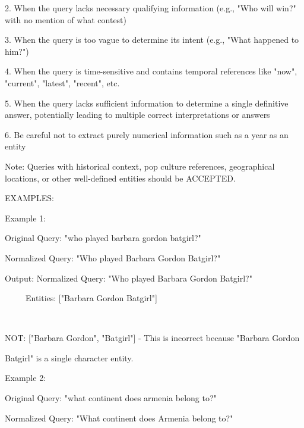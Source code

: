 \begin{tcolorbox}[breakable,title=Prompt Used by the GPT-4o for Data Filtering]
2. When the query lacks necessary qualifying information (e.g., "Who will win?" with no mention of what contest)



3. When the query is too vague to determine its intent (e.g., "What happened to him?")



4. When the query is time-sensitive and contains temporal references like "now", "current", "latest", "recent", etc.



5. When the query lacks sufficient information to determine a single definitive answer, potentially leading to multiple correct interpretations or answers



6. Be careful not to extract purely numerical information such as a year as an entity





Note: Queries with historical context, pop culture references, geographical locations, or other well-defined entities should be ACCEPTED.





EXAMPLES:





Example 1:



Original Query: "who played barbara gordon batgirl?"



Normalized Query: "Who played Barbara Gordon Batgirl?"



Output: Normalized Query: "Who played Barbara Gordon Batgirl?"



      Entities: ["Barbara Gordon Batgirl"]

      

NOT: ["Barbara Gordon", "Batgirl"] - This is incorrect because "Barbara Gordon 

Batgirl" is a single character entity.



Example 2:



Original Query: "what continent does armenia belong to?"



Normalized Query: "What continent does Armenia belong to?"




\end{tcolorbox}
